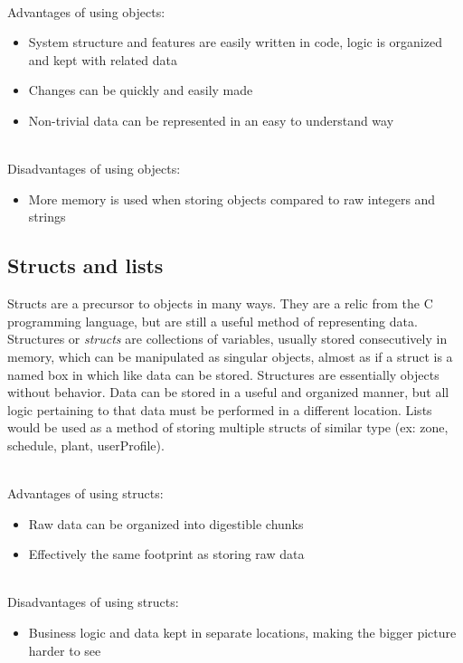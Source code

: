 \documentclass[onecolumn, draftclsnofoot,10pt, compsoc]{IEEEtran}
\begin{document}
			\noindent \\Advantages of using objects:
			\begin{itemize}
				\item System structure and features are easily written in code, logic is organized and kept with related data
				\item Changes can be quickly and easily made
				\item Non-trivial data can be represented in an easy to understand way
			\end{itemize}

			\noindent \\Disadvantages of using objects:
			\begin{itemize}
				\item More memory is used when storing objects compared to raw integers and strings
			\end{itemize}


			\subsection{Structs and lists}
			Structs are a precursor to objects in many ways. They are a relic from the C programming language, but are still a useful method of representing data.
			Structures or \textit{structs} are collections of variables, usually stored consecutively in memory, which can be manipulated as singular objects, almost as if a struct is a named box in which like data can be stored.
			Structures are essentially objects without behavior. Data can be stored in a useful and organized manner, but all logic pertaining to that data must be performed in a different location.
			Lists would be used as a method of storing multiple structs of similar type (ex: zone, schedule, plant, userProfile).

			\noindent \\Advantages of using structs:
			\begin{itemize}
				\item Raw data can be organized into digestible chunks
				\item Effectively the same footprint as storing raw data
			\end{itemize}

			\noindent \\Disadvantages of using structs:
			\begin{itemize}
				\item Business logic and data kept in separate locations, making the bigger picture harder to see
			\end{itemize}
\end{document}
